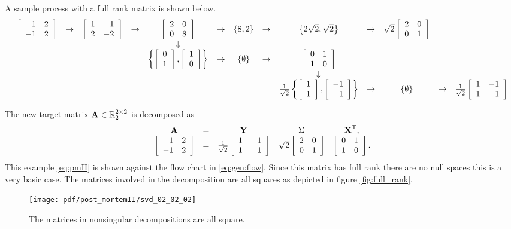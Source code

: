 \begin{landscape}
A sample process with a full rank matrix is shown below.
\begin{equation*}
  \begin{array}{ccccccccccccc}
  \mat{rr}{1&2\\-1&2}&\rightarrow&\mat{rr}{1&1\\2&-2}&\rightarrow&\mat{cc}{2&0\\0&8}&\rightarrow&\lst{8,2}&\rightarrow&\lst{2\sqrt{2},\sqrt{2}}&\rightarrow&\sqrt{2}\mat{cc}{2&0\\0&1}\\
  &&&&\downarrow\\
  &&&&\lst{\mat{c}{0\\1},\mat{c}{1\\0}}&\rightarrow&\lst{\emptyset}&\rightarrow&\mat{cc}{0&1\\1&0}\\
  &&&&&&&&\downarrow\\
  &&&&&&&&\frac{1}{\sqrt{2}}\lst{\mat{c}{1\\1},\mat{r}{-1\\1}}&\rightarrow&\lst{\emptyset}&\rightarrow&\frac{1}{\sqrt{2}}\mat{cr}{1&-1\\1&1}\\
  \end{array}
  \label{eq:pmII}
\end{equation*}
\end{landscape}

The new target matrix $\textbf{A}^{\mathrm{}}\in\mathbb{R}^{2 \times 2}_{2}$ is decomposed as
\begin{equation}
  \begin{array}{ccccc}
    \A{} &=& \Y{} & \sig{} & \X{T}, \\
    \mat{rr}{1&2\\-1&2} &=& \stwo\mat{cr}{1&-1\\1&1}
    & \sqrt{2}\mat{cc}{2&0\\0&1}
    & \mat{cc}{0&1\\1&0}.
  \end{array}
  \label{eq:pmII:A}
\end{equation}
This example \eqref{eq:pmII} is shown against the flow chart in \eqref{eq:gen:flow}. Since this matrix has full rank there are no null spaces this is a very basic case. The matrices involved in the decomposition are all squares as depicted in figure \eqref{fig:full_rank}.

\begin{figure}[htbp] %
   \centering
   \texttt{[image: pdf/post\_mortemII/svd\_02\_02\_02]} 
   \caption{The matrices in nonsingular decompositions are all square.}
   \label{fig:full_rank}
\end{figure}

